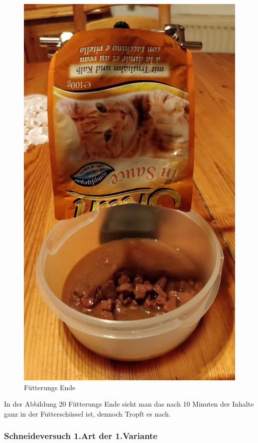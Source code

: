 \documentclass[a4paper,12pt]{scrartcl}
\begin{document}
\begin{figure}[H]
\begin{minipage}[hbt]{.3\linewidth}
      \includegraphics[width=\linewidth]{Bilder/Fuetterungsexperiment/Fuetterungs_Ende}
      \caption{Fütterungs Ende}
   \end{minipage}
\end{figure}

In der Abbildung 20 Fütterungs Ende sieht man das nach 10 Minuten der Inhalte ganz in der Futterschüssel ist, dennoch Tropft es nach.
\newpage
\subsubsection{Schneideversuch 1.Art der 1.Variante}
\end{document}
